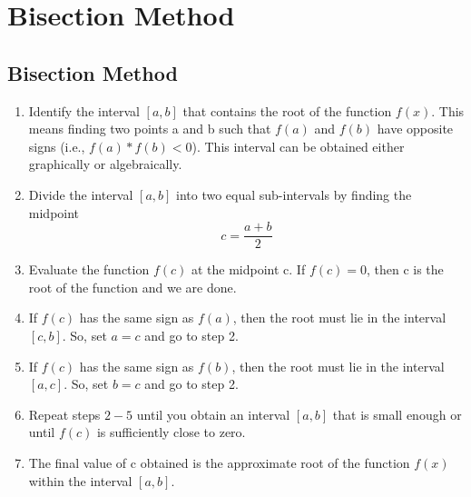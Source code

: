 \newpage
\chapter{Bisection Method}

\section{Bisection Method}

\begin{enumerate}

    \item Identify the interval $[a,b]$ that contains the root of the function $f(x)$. This means finding two points a and b such that $f(a)$ and $f(b)$ have opposite signs (i.e., $f(a) * f(b) < 0$). This interval can be obtained either graphically or algebraically.

    \item Divide the interval $[a,b]$ into two equal sub-intervals by finding the midpoint
    \begin{equation*}
        c = \frac{a + b}{2}
    \end{equation*}

    \item Evaluate the function $f(c)$ at the midpoint c. If $f(c) = 0$, then c is the root of the function and we are done.

    \item If $f(c)$ has the same sign as $f(a)$, then the root must lie in the interval $[c,b]$. So, set $a = c$ and go to step 2.

    \item If $f(c)$ has the same sign as $f(b)$, then the root must lie in the interval $[a,c]$. So, set $b = c$ and go to step 2.

    \item Repeat steps $2-5$ until you obtain an interval $[a,b]$ that is small enough or until $f(c)$ is sufficiently close to zero.

    \item The final value of c obtained is the approximate root of the function $f(x)$ within the interval $[a,b]$.

\end{enumerate}

